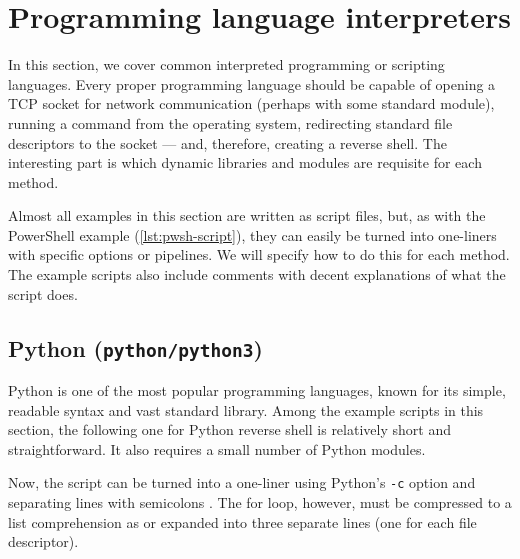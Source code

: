 \section{Programming language interpreters}
\label{program-interpreters}

In this section, we cover common interpreted programming or scripting languages. Every proper programming language should be capable of opening a TCP socket for network communication (perhaps with some standard module), running a command from the operating system, redirecting standard file descriptors to the socket — and, therefore, creating a reverse shell. The interesting part is which dynamic libraries and modules are requisite for each method.

Almost all examples in this section are written as script files, but, as with the PowerShell example (\cref{lst:pwsh-script}), they can easily be turned into one-liners with specific options or pipelines. We will specify how to do this for each method. The example scripts also include comments with decent explanations of what the script does.


\subsection{Python (\texttt{python/python3})}


Python is one of the most popular programming languages, known for its simple, readable syntax and vast standard library. Among the example scripts in this section, the following one for Python reverse shell is relatively short and straightforward. It also requires a small number of Python modules.




Now, the script can be turned into a one-liner using Python's \texttt{-c} option and separating lines with semicolons \cite{python-man}. The for loop, however, must be compressed to a list comprehension as  or expanded into three separate lines (one for each file descriptor).


